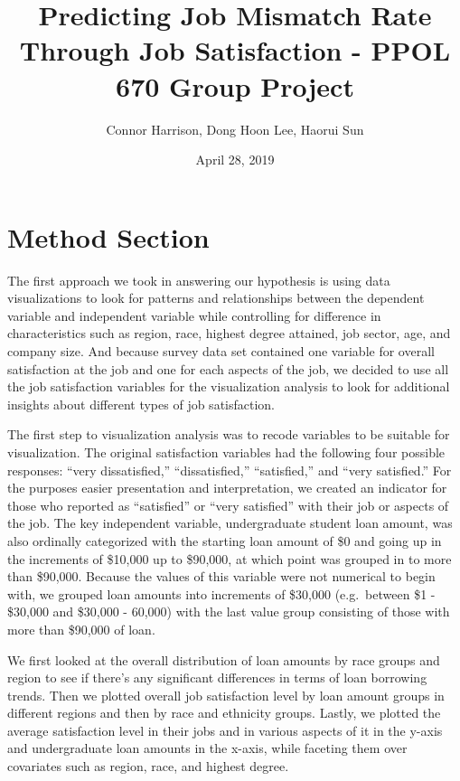 \documentclass[]{article}
\title{Predicting Job Mismatch Rate Through Job Satisfaction - PPOL 670 Group
Project}
\author{Connor Harrison, Dong Hoon Lee, Haorui Sun}
\date{April 28, 2019}
\begin{document}
\maketitle

\section{Method Section}\label{method-section}

The first approach we took in answering our hypothesis is using data
visualizations to look for patterns and relationships between the
dependent variable and independent variable while controlling for
difference in characteristics such as region, race, highest degree
attained, job sector, age, and company size. And because survey data set
contained one variable for overall satisfaction at the job and one for
each aspects of the job, we decided to use all the job satisfaction
variables for the visualization analysis to look for additional insights
about different types of job satisfaction.

The first step to visualization analysis was to recode variables to be
suitable for visualization. The original satisfaction variables had the
following four possible responses: ``very dissatisfied,''
``dissatisfied,'' ``satisfied,'' and ``very satisfied.'' For the
purposes easier presentation and interpretation, we created an indicator
for those who reported as ``satisfied'' or ``very satisfied'' with their
job or aspects of the job. The key independent variable, undergraduate
student loan amount, was also ordinally categorized with the starting
loan amount of \$0 and going up in the increments of \$10,000 up to
\$90,000, at which point was grouped in to more than \$90,000. Because
the values of this variable were not numerical to begin with, we grouped
loan amounts into increments of \$30,000 (e.g.~between \$1 - \$30,000
and \$30,000 - 60,000) with the last value group consisting of those
with more than \$90,000 of loan.

We first looked at the overall distribution of loan amounts by race
groups and region to see if there's any significant differences in terms
of loan borrowing trends. Then we plotted overall job satisfaction level
by loan amount groups in different regions and then by race and
ethnicity groups. Lastly, we plotted the average satisfaction level in
their jobs and in various aspects of it in the y-axis and undergraduate
loan amounts in the x-axis, while faceting them over covariates such as
region, race, and highest degree.
\end{document}

